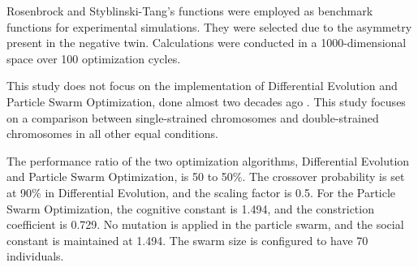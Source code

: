 \documentclass[runningheads]{llncs}
\begin{document}
Rosenbrock and Styblinski-Tang's functions were employed as benchmark functions for experimental simulations. They were selected due to the asymmetry present in the negative twin. Calculations were conducted in a 1000-dimensional space over 100 optimization cycles. 

This study does not focus on the implementation of Differential Evolution and Particle Swarm Optimization, done almost two decades ago \cite{Zhang-2003,Xie-2004}. This study focuses on a comparison between single-strained chromosomes and double-strained chromosomes in all other equal conditions.

The performance ratio of the two optimization algorithms, Differential Evolution and Particle Swarm Optimization, is 50 to 50\%. The crossover probability is set at 90\% in Differential Evolution, and the scaling factor is 0.5. For the Particle Swarm Optimization, the cognitive constant is 1.494, and the constriction coefficient is 0.729. No mutation is applied in the particle swarm, and the social constant is maintained at 1.494. The swarm size is configured to have 70 individuals.

\begin{table}
\caption{Experimental results}\label{tab1}
\centering
{}
\end{table}
\end{document}
